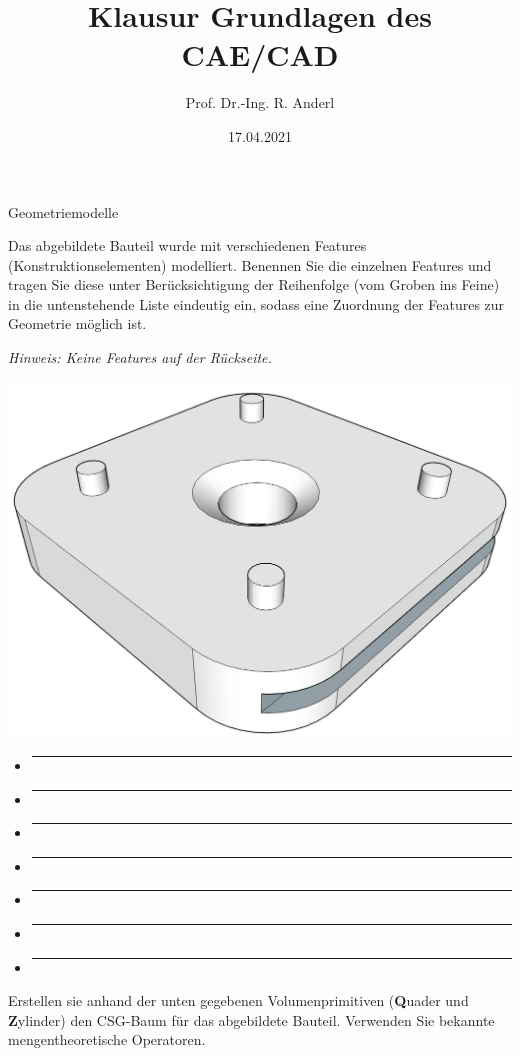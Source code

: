 \documentclass[
	ngerman,
	color = black,
	]{tudaexercise}
\begin{document}
\title[Übung TUDaExercise]{Klausur Grundlagen des CAE/CAD}
\author{Prof. Dr.-Ing. R. Anderl}
\date{17.04.2021}

\maketitle

\begin{task}[credit=13 P]{Geometriemodelle}
	\begin{subtask}[credit=4 P]
		Das abgebildete Bauteil wurde mit verschiedenen Features (Konstruktionselementen) modelliert.
		Benennen Sie die einzelnen Features und tragen Sie diese unter Berücksichtigung der Reihenfolge (vom Groben ins Feine) in die untenstehende Liste eindeutig ein, sodass eine Zuordnung der Features zur Geometrie möglich ist.
		
		\textit{Hinweis: Keine Features auf der Rückseite.}
		\begin{multicols}{2}
			\includegraphics[width=.5\textwidth]{Grdl_Klausur_A1a.png}
			\columnbreak
			\begin{itemize}
				\item \rule{8cm}{0.15mm}
				\item \rule{8cm}{0.15mm}
				\item \rule{8cm}{0.15mm}
				\item \rule{8cm}{0.15mm}
				\item \rule{8cm}{0.15mm}
				\item \rule{8cm}{0.15mm}
				\item \rule{8cm}{0.15mm}
			\end{itemize}
		\end{multicols}
		
	\end{subtask}
	
	\pagebreak
	
	\begin{subtask}[credit=9 P]
		Erstellen sie anhand der unten gegebenen Volumenprimitiven (\textbf{Q}uader und \textbf{Z}ylinder) den CSG-Baum für das abgebildete Bauteil.
		Verwenden Sie bekannte mengentheoretische Operatoren.
		

\end{subtask}
\end{task}
\end{document}
